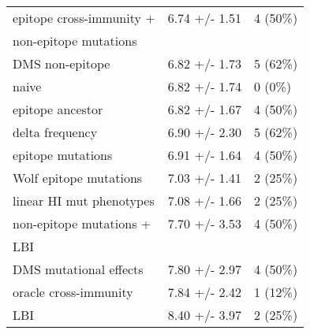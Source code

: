 \begin{tabular*}{0.7\textwidth}{lrl}
          epitope cross-immunity + &                          6.74 +/- 1.51 &                               4 (50\%) \\
 \hspace{3mm}non-epitope mutations &                                        &                                        \\
                   DMS non-epitope &                          6.82 +/- 1.73 &                               5 (62\%) \\
                             naive &                          6.82 +/- 1.74 &                                0 (0\%) \\
                  epitope ancestor &                          6.82 +/- 1.67 &                               4 (50\%) \\
                   delta frequency &                          6.90 +/- 2.30 &                               5 (62\%) \\
                 epitope mutations &                          6.91 +/- 1.64 &                               4 (50\%) \\
            Wolf epitope mutations &                          7.03 +/- 1.41 &                               2 (25\%) \\
          linear HI mut phenotypes &                          7.08 +/- 1.66 &                               2 (25\%) \\
           non-epitope mutations + &                          7.70 +/- 3.53 &                               4 (50\%) \\
                   \hspace{3mm}LBI &                                        &                                        \\
            DMS mutational effects &                          7.80 +/- 2.97 &                               4 (50\%) \\
             oracle cross-immunity &                          7.84 +/- 2.42 &                               1 (12\%) \\
                               LBI &                          8.40 +/- 3.97 &                               2 (25\%) \\
\bottomrule
\end{tabular*}
